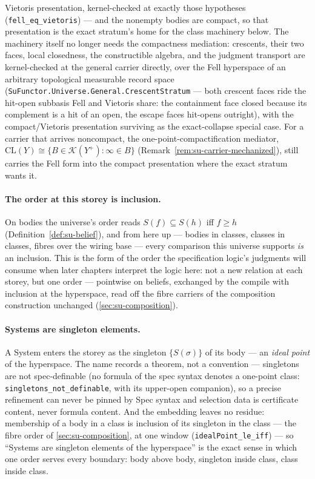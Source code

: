 Vietoris presentation, kernel-checked at exactly those hypotheses
(\texttt{fell\_eq\_vietoris}) --- and the nonempty bodies are
compact, so that presentation is the exact stratum's home for the
class machinery below. The machinery itself no longer needs the
compactness mediation: crescents, their two faces, local
closedness, the constructible algebra, and the judgment transport
are kernel-checked at the general carrier directly, over the Fell
hyperspace of an arbitrary topological measurable record space
(\texttt{SuFunctor.Universe.General.CrescentStratum} --- both
crescent faces ride the hit-open subbasis Fell and Vietoris share:
the containment face closed because its complement is a hit of an
open, the escape faces hit-opens outright), with the
compact/Vietoris presentation surviving as the exact-collapse
special case. For a carrier that arrives noncompact, the
one-point-compactification mediator,
$\mathrm{CL}(Y) \cong \{B \in \mathcal{K}(Y^{+}) : \infty \in B\}$
(Remark~\ref{rem:su-carrier-mechanized}), still carries the Fell
form into the compact presentation where the exact stratum wants
it.

\paragraph{The order at this storey is inclusion.} On bodies the
universe's order reads $S(f) \subseteq S(h)$ iff $f \ge h$
(Definition~\ref{def:su-belief}), and from here up ---
bodies in classes, classes in classes, fibres over the wiring base
--- every comparison this universe supports \emph{is} an inclusion.
This is the form of the order the specification logic's judgments
will consume when later chapters interpret the logic here: not a
new relation at each storey, but one order --- pointwise on
beliefs, exchanged by the compile with inclusion at the
hyperspace, read off the fibre carriers of the composition construction
unchanged (\autoref{sec:su-composition}).

\paragraph{Systems are singleton elements.} A System enters the
storey as the singleton $\{S(\sigma)\}$ of its body --- an
\emph{ideal point} of the hyperspace. The name records a theorem,
not a convention --- singletons are not spec-definable (no formula
of the spec syntax denotes a one-point class:
\texttt{singletons\_not\_definable}, with its upper-open companion),
so a precise refinement can never be pinned by Spec syntax and
selection data is certificate content, never formula content. And
the embedding leaves no residue: membership of a body in a class is
inclusion of its singleton in the class --- the fibre order of
\autoref{sec:su-composition}, at one window
(\texttt{idealPoint\_le\_iff}) --- so ``Systems are singleton
elements of the hyperspace'' is the exact sense in which one order
serves every boundary: body above body, singleton inside class,
class inside class.

